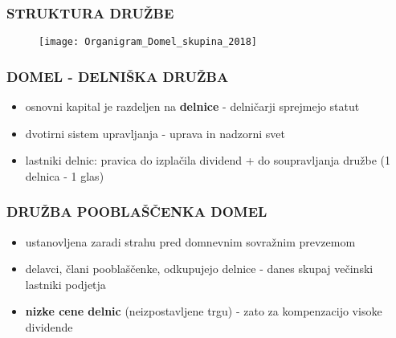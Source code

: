 \documentclass{beamer}
\begin{document}
\begin{frame}
\frametitle{STRUKTURA DRUŽBE}
\begin{figure}
\texttt{[image: Organigram\_Domel\_skupina\_2018]}
\end{figure}
\end{frame}


\begin{frame}
\frametitle{DOMEL - DELNIŠKA DRUŽBA}
\begin{itemize}
\item osnovni kapital je razdeljen na \textbf{delnice} - delničarji sprejmejo statut
\item dvotirni sistem upravljanja - uprava in nadzorni svet
\item lastniki delnic: pravica do izplačila dividend + do soupravljanja družbe (1 delnica - 1 glas)
\end{itemize}
\end{frame}




\begin{frame}
\frametitle{DRUŽBA POOBLAŠČENKA DOMEL}
\begin{itemize}
\item ustanovljena zaradi strahu pred domnevnim sovražnim prevzemom
\item delavci, člani pooblaščenke, odkupujejo delnice - danes skupaj večinski lastniki podjetja
\item  \textbf{nizke cene delnic} (neizpostavljene trgu) - zato za kompenzacijo visoke dividende  
\end{itemize}
\end{frame}
\end{document}

